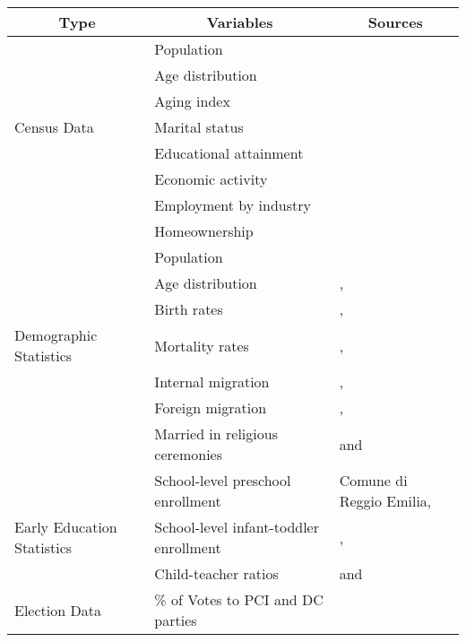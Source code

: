 \begin{tabular}{lll}
\toprule
\multicolumn{1}{c}{Type}	&	\multicolumn{1}{c}{Variables}	&	\multicolumn{1}{c}{Sources}	\\
\midrule
			&	Population & \\
			& 	Age distribution & \\
			&	Aging index & \\
Census Data	&	Marital status & \citet{Istat_2014_Atlante-Statistico} \\
			& 	Educational attainment & \\
			& 	Economic activity & \\
			& 	Employment by industry & \\
			& 	Homeownership	&	\\
\midrule
						&	Population 		&	 \\
						&	Age distribution 	&	\citet{Reggio-Emilia-Admin-Data_1966-2010}, \\
						&	Birth rates 		& 	\citet{Padova-Admin-Data_1964-2010}, 	\\
	Demographic Statistics	&	Mortality rates 		&	\citet{Statistica-Regionae_2016_Veneto}, \\
						&	Internal migration 	&  	\citet{Emilia-Romagna_2016_Population},\\
						&	Foreign migration 	&	\citet{Statistica-Regionae_2016_Veneto}, \\
						& 	Married in religious ceremonies	& 	and \citet{Istat_2016_Geo-Demo} \\
\midrule
						&	School-level preschool enrollment	 &	Comune di Reggio Emilia, \\
	Early Education Statistics	& 	School-level infant-toddler enrollment & 	\citet{Padova-Admin-Data_1964-2010},  \\
						& 	Child-teacher ratios				&	and \citet{Reggio-Emilia-Admin-Data_1966-2010} \\
\midrule
Election Data				&	\% of Votes to PCI and DC parties 	&	\citet{Archivo-Storico_2016} \\
\bottomrule
\end{tabular}


